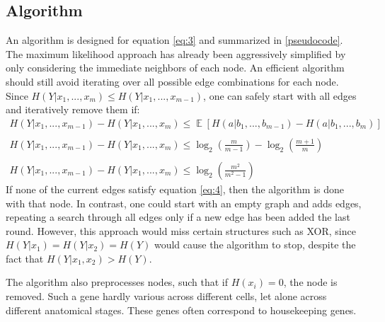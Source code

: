 \documentclass[a4paper,12pt]{book}
\theoremstyle{break}
\DeclareMathOperator{\EX}{\mathbb{E}}
\begin{document}
 \subsection*{Algorithm}
 An algorithm is designed for equation \ref{eq:3} and summarized in \ref{pseudocode}. The maximum likelihood approach has already been aggressively simplified by only considering the immediate neighbors of each node. An efficient algorithm should still avoid iterating over all possible edge combinations for each node. Since $H(Y|x_1,...,x_m) \leq H(Y|x_1,...,x_{m-1})$, one can safely start with all edges and iteratively remove them if:
 \begin{equation} \label{eq:4}
 \begin{split}
 H(Y|x_1,...,x_{m-1}) -  H(Y|x_1,...,x_m) \leq \EX[{H(a|b_1,...,b_{m-1}) -  H(a|b_1,...,b_m)}]  \\ \\
 H(Y|x_1,...,x_{m-1}) -  H(Y|x_1,...,x_m) \leq \log_2(\frac{m}{m-1}) - \log_2(\frac{m+1}{m})  \\ \\
 H(Y|x_1,...,x_{m-1}) -  H(Y|x_1,...,x_m) \leq \log_2(\frac{m^2}{m^2-1})  
 \end{split}
 \end{equation}
 If none of the current edges satisfy equation \ref{eq:4}, then the algorithm is done with that node. In contrast, one could start with an empty graph and adds edges, repeating a search through all edges only if a new edge has been added the last round. However, this approach would miss certain structures such as XOR, since $H(Y|x_1) = H(Y|x_2) = H(Y)$ would cause the algorithm to stop, despite the fact that  $H(Y|x_1,x_2) > H(Y)$.
 
 The algorithm also preprocesses nodes, such that if $H(x_i) = 0$, the node is removed. Such a gene hardly various across different cells, let alone across different anatomical stages. These genes often correspond to housekeeping genes.
 
\end{document}
